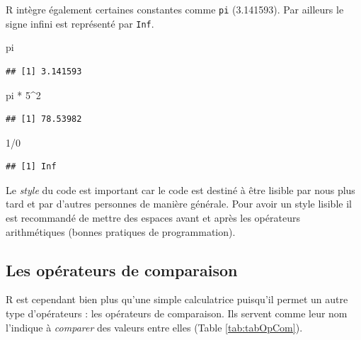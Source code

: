 \documentclass[twoside,symmetric]{book}
\newenvironment{Shaded}{}{}
\newcommand{\DecValTok}[1]{#1}
\newcommand{\NormalTok}[1]{#1}
\newcommand{\OperatorTok}[1]{#1}
\newcommand{\StringTok}[1]{#1}
\begin{document}
R intègre également certaines constantes comme \texttt{pi} (3.141593). Par ailleurs le signe infini est représenté par \texttt{Inf}.

\begin{Shaded}
\begin{Highlighting}[]
\NormalTok{pi}
\end{Highlighting}
\end{Shaded}

\begin{verbatim}
## [1] 3.141593
\end{verbatim}

\begin{Shaded}
\begin{Highlighting}[]
\NormalTok{pi }\OperatorTok{*}\StringTok{ }\DecValTok{5}\OperatorTok{^}\DecValTok{2}
\end{Highlighting}
\end{Shaded}

\begin{verbatim}
## [1] 78.53982
\end{verbatim}

\begin{Shaded}
\begin{Highlighting}[]
\DecValTok{1}\OperatorTok{/}\DecValTok{0}
\end{Highlighting}
\end{Shaded}

\begin{verbatim}
## [1] Inf
\end{verbatim}

Le \emph{style} du code est important car le code est destiné à être lisible par nous plus tard et par d'autres personnes de manière générale. Pour avoir un style lisible il est recommandé de mettre des espaces avant et après les opérateurs arithmétiques (bonnes pratiques de programmation).

\hypertarget{l011opcomp}{%
\subsection{Les opérateurs de comparaison}\label{l011opcomp}}

R est cependant bien plus qu'une simple calculatrice puisqu'il permet un autre type d'opérateurs : les opérateurs de comparaison. Ils servent comme leur nom l'indique à \emph{comparer} des valeurs entre elles (Table \ref{tab:tabOpCom}).
\end{document}
